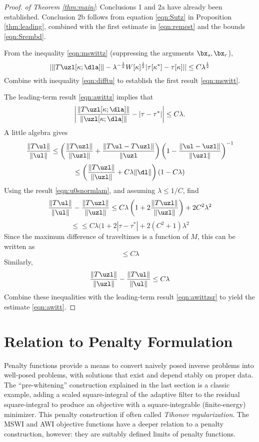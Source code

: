 \begin{proof} {\em of Theorem \ref{thm:main}}:
Conclusions 1 and 2a have already been established. Conclusion 2b
follows from equation \ref{eqn:Sutz} in Proposition \ref{thm:leading},
combined with the first estimate in \ref{eqn:remest} and the bounds
\ref{eqn:Srembd}.

  From the inequality \ref{eqn:mswittz}
  (suppressing the arguments $\bx_s,\bx_r$),
  \[
   | \|T\uzl[\kappa;\dla] \|- 
   \lambda^{-\frac{1}{2}}
   W[\kappa]^{\frac{1}{2}}|\tau[\kappa^*]-\tau[\kappa]| | \le
   C\lambda^{\frac{1}{2}}
 \]
 Combine with inequality \ref{eqn:difftu} to establish the first
 result \ref{eqn:mswitt}.

 The leading-term result \ref{eqn:awittz} implies that
 \begin{equation}
   \label{eqn:awittzsr}
   \left| \frac{\|T\uzl[\kappa;\dla] \|}{
       \|\uzl[\kappa;\dla] \|} - |\tau-\tau^*|\right|  \le C\lambda.
 \end{equation}
 A little algebra gives
 \[
   \frac{\|T\ul\|}{\|\ul\|} \le \left(\frac{\|T\uzl\|}{\|\uzl\|}+\frac{\|T\ul
     -T\uzl\|}{\|\uzl}\right)\left(1-\frac{\|\ul-\uzl\|}{\|\uzl\|}\right)^{-1}
 \]
 \[
   \le \left(\frac{\|T\uzl\|}{\|\uzl\|} + C\lambda \|\dl\|\right) (1-C\lambda)
 \]
 Using the result \ref{eqn:u0snormlam}, and assuming $\lambda \le
 1/C$, find
 \[
 \frac{\|T\ul\|}{\|\ul\|}-\frac{\|T\uzl\|}{\|\uzl\|} \le C\lambda
 \left(1+2 \frac{\|T\uzl\|}{\|\uzl\|} \right) + 2 C^2 \lambda^2
\]
\[
  \le \le C\lambda  (1+2|\tau - \tau^*| + 2 (C^2+1) \lambda^2
\]
Since the maximum difference of traveltimes is a function of $M$, this
can be written as
\[
  \le C\lambda
\]
Similarly,
\[
  \frac{\|T\uzl\|}{\|\uzl\|}-\frac{\|T\ul\|}{\|\ul\|} \le C\lambda
\]
Combine these inequalities with the leading-term result
\ref{eqn:awittzsr} to yield the estimate \ref{eqn:awitt}.

\end{proof}


\section{Relation to Penalty Formulation}
Penalty functions provide a means to convert naively posed
inverse problems into well-posed problems, with solutions that exist
and depend stably on proper data. The ``pre-whitening'' construction
explained in the last section is a classic example, adding a scaled
square-integral of the adaptive filter to the residual square-integral to
produce an objective with a square-integrable (finite-energy)
minimizer. This penalty construction if often called {\em Tihonov
  regularization}. The MSWI and AWI objective functions have a deeper
relation to a penalty construction, however: they are
suitably defined limits of penalty functions.

